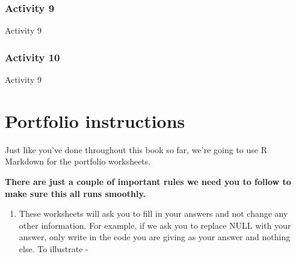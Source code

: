 \documentclass[]{book}
\newenvironment{Shaded}{\begin{snugshade}}{\end{snugshade}}
\newcommand{\DataTypeTok}[1]{\textcolor[rgb]{0.13,0.29,0.53}{#1}}
\newcommand{\DecValTok}[1]{\textcolor[rgb]{0.00,0.00,0.81}{#1}}
\newcommand{\FloatTok}[1]{\textcolor[rgb]{0.00,0.00,0.81}{#1}}
\newcommand{\KeywordTok}[1]{\textcolor[rgb]{0.13,0.29,0.53}{\textbf{#1}}}
\newcommand{\NormalTok}[1]{#1}
\newcommand{\OperatorTok}[1]{\textcolor[rgb]{0.81,0.36,0.00}{\textbf{#1}}}
\newcommand{\OtherTok}[1]{\textcolor[rgb]{0.56,0.35,0.01}{#1}}
\newcommand{\StringTok}[1]{\textcolor[rgb]{0.31,0.60,0.02}{#1}}
\providecommand{\tightlist}{%
  \setlength{\itemsep}{0pt}\setlength{\parskip}{0pt}}
\begin{document}
\hypertarget{activity-9-3}{%
\subsection{Activity 9}\label{activity-9-3}}

Activity 9

\begin{Shaded}
\end{Shaded}

\hypertarget{activity-10-1}{%
\subsection{Activity 10}\label{activity-10-1}}

Activity 9

\begin{Shaded}
\end{Shaded}

\hypertarget{portfolio-instructions}{%
\chapter{Portfolio instructions}\label{portfolio-instructions}}

Just like you've done throughout this book so far, we're going to use R Markdown for the portfolio worksheets.

\textbf{There are just a couple of important rules we need you to follow to make sure this all runs smoothly.}

\begin{enumerate}
\def\labelenumi{\arabic{enumi}.}
\tightlist
\item
  These worksheets will ask you to fill in your answers and not change any other information. For example, if we ask you to replace NULL with your answer, only write in the code you are giving as your answer and nothing else. To illustrate -
\end{enumerate}
\end{document}
